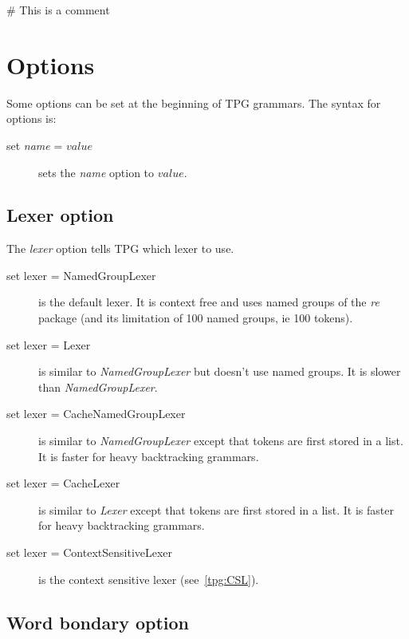 \begin{verbatimtab}[4]
    # This is a comment
\end{verbatimtab}

\section{Options}                                           \label{grammar:options}

Some options can be set at the beginning of TPG grammars.
The syntax for options is:

\begin{description}
    \item [set \emph{name} = \emph{$value$}] sets the \emph{name} option to \emph{$value$}.
\end{description}

\subsection{Lexer option}                                   \label{grammar:lexer_option}

The \emph{lexer} option tells TPG which lexer to use.

\begin{description}
    \item [set lexer = NamedGroupLexer] is the default lexer.
        It is context free and uses named groups of the \emph{re} package (and its limitation of 100 named groups, ie 100 tokens).
    \item [set lexer = Lexer] is similar to \emph{NamedGroupLexer} but doesn't use named groups.
        It is slower than \emph{NamedGroupLexer}.
    \item [set lexer = CacheNamedGroupLexer] is similar to \emph{NamedGroupLexer} except that tokens are first stored in a list.
        It is faster for heavy backtracking grammars.
    \item [set lexer = CacheLexer] is similar to \emph{Lexer} except that tokens are first stored in a list.
        It is faster for heavy backtracking grammars.
    \item [set lexer = ContextSensitiveLexer] is the context sensitive lexer (see~\ref{tpg:CSL}).
\end{description}

\subsection{Word bondary option}                            \label{grammar:word_boundary_option}

